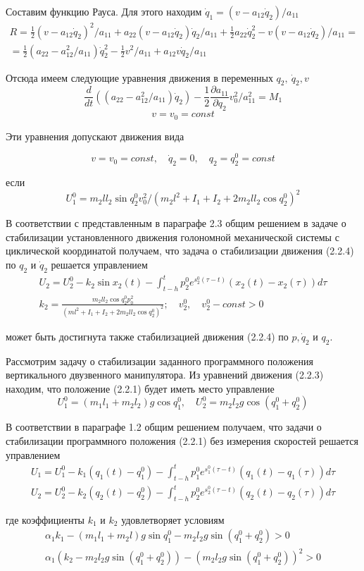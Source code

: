 Составим функцию Рауса. Для этого находим $\dot q_1 = (v - a_12 \dot q_2) / a_{11}$
$$
\begin{array}{c}
\displaystyle R = \frac12 (v - a_{12} \dot q_2)^2 / a_{11} + a_{22} (v - a_{12} \dot q_2) \dot q_2 / a_{11} + \frac12 a_{22} \dot q_2^2 - v (v - a_{12} \dot q_2) / a_{11} =\\
\displaystyle = \frac12 (a_{22} - a_{12}^2 / a_{11}) \dot q_2^2 - \frac12 v^2 / a_{11} + a_{12} v \dot q_2 / a_{11}
\end{array}
$$

Отсюда имеем следующие уравнения движения в переменных $q_2, \ \dot q_2, v$
$$\frac{d}{dt} ((a_{22} - a_{12}^2 / a_{11}) \dot q_2) - \frac12 \frac{\partial a_{11}}{\partial q_2} v_0^2 / a_{11}^2 = M_1$$
$$v = v_0 = const$$

Эти уравнения допускают движения вида 

\begin{equation}
v = v_0 = const, \quad \dot q_2 = 0, \quad q_2 = q_2^0 = const
\end{equation}

если 
$$U_1^0 = m_2 l l_2 \sin q_2^0 v_0^2 / (m_2 l^2 + I_1 + I_2 + 2 m_2 l l_2 \cos q_2^0)^2$$

В соответствии с представленным в параграфе 2.3 общим решением в задаче о стабилизации установленного движения голономной механической системы с циклической координатой получаем, что задача о стабилизации движения (2.2.4) по $q_2$ и $\dot q_2$ решается управлением
$$
\begin{array}{c}
\displaystyle U_2 = U_2^0 - k_2 \sin x_2 (t) - \int_{t-h}^{t} p_2^0 e^{s_2^0 (\tau - t)} (x_2 (t) - x_2 (\tau)) d \tau\\
\displaystyle k_2 = \frac{m_2 l l_2 \cos q_2^0 p_0^2}{(m l^2 + I_1 + I_2 + 2 m_2 l l_2 \cos q_2^0)^2}; \quad v_2^0, \quad v_2^0 - const > 0
\end{array}
$$

может быть достигнута также стабилизацией движения (2.2.4) по $p, \dot q_2$ и $q_2.$

Рассмотрим задачу о стабилизации заданного программного положения вертикального двузвенного манипулятора. Из уравнений движения (2.2.3) находим, что положение (2.2.1) будет иметь место управление $$U_1^0 = (m_1 l_1 + m_2 l_2) g \cos q_1^0, \quad U_2^0 = m_2 l_2 g \cos (q_1^0 + q_2^0)$$

В соответствии в параграфе 1.2 общим решением получаем, что задачи о стабилизации программного положения (2.2.1) без измерения скоростей решается управлением 
$$
\begin{array}{l}
\displaystyle U_1 = U_1^0 - k_1 (q_1(t) - q_1^0) - \int_{t-h}^{t} p_1^0 e^{s_1^0 (\tau - t)} (q_1(t) - q_1(\tau)) d \tau\\
\displaystyle U_2 = U_2^0 - k_2 (q_2(t) - q_2^0) - \int_{t-h}^{t} p_2^0 e^{s_2^0 (\tau - t)} (q_2(t) - q_2(\tau)) d \tau
\end{array}
$$

где коэффициенты $k_1$ и $k_2$ удовлетворяет условиям 
$$
\begin{array}{c}
\alpha_1 k_1 - (m_1 l_1 + m_2 l) g \sin q_1^0 - m_2 l_2 g \sin (q_1^0 + q_2^0) > 0\\
\alpha_1 (k_2 - m_2 l_2 g \sin (q_1^0 + q_2^0)) - (m_2 l_2 g \sin (q_1^0 + q_2^0))^2 > 0
\end{array}
$$